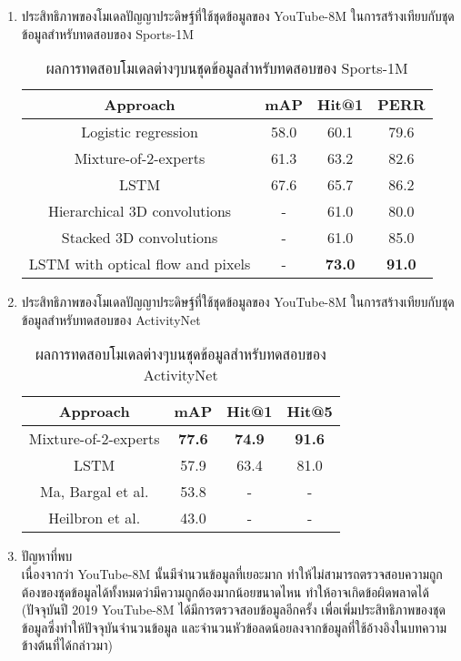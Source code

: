 \begin{enumerate}
\begin{enumerate}
			\clearpage
			\item ประสิทธิภาพของโมเดลปัญญาประดิษฐ์ที่ใช้ชุดข้อมูลของ YouTube-8M ในการสร้างเทียบกับชุดข้อมูลสำหรับทดสอบของ Sports-1M
			\begin{table}[!ht]
				\centering
				\begin{tabular}{|c|c|c|c|}
					\hline
					{Approach} & {mAP} & Hit@1 & PERR\\
					\hline
					Logistic regression & 58.0 & 60.1 & 79.6\\
					Mixture-of-2-experts & 61.3 & 63.2 & 82.6\\
					LSTM & 67.6 & 65.7 & 86.2\\
					\hline
					Hierarchical 3D convolutions\textsuperscript{\cite{karpathy2014large}} & - & 61.0 & 80.0\\
					Stacked 3D convolutions\textsuperscript{\cite{yue2015beyond}} & - & 61.0 & 85.0\\
					LSTM with optical flow and pixels\textsuperscript{\cite{tran2014c3d}} & - & \textbf{73.0} & \textbf{91.0}\\
					\hline
				\end{tabular}
				\caption{ผลการทดสอบโมเดลต่างๆบนชุดข้อมูลสำหรับทดสอบของ Sports-1M}
				\label{tab: youtube_youtube}
			\end{table}
		\item ประสิทธิภาพของโมเดลปัญญาประดิษฐ์ที่ใช้ชุดข้อมูลของ YouTube-8M ในการสร้างเทียบกับชุดข้อมูลสำหรับทดสอบของ ActivityNet
			\begin{table}[!ht]
				\centering
				\begin{tabular}{|c|c|c|c|}
					\hline
					{Approach} & {mAP} & Hit@1 & Hit@5\\
					\hline
					Mixture-of-2-experts & \textbf{77.6} & \textbf{74.9} & \textbf{91.6}\\
					LSTM & 57.9 & 63.4 & 81.0\\
					\hline
					Ma, Bargal et al.\textsuperscript{\cite{ma2017less}} & 53.8 & - & -\\
					Heilbron et al.\textsuperscript{\cite{caba2015activitynet}} & 43.0 & - & -\\
					\hline
				\end{tabular}
				\caption{ผลการทดสอบโมเดลต่างๆบนชุดข้อมูลสำหรับทดสอบของ ActivityNet}
				\label{tab: youtube_youtube}
			\end{table}
		\item ปัญหาที่พบ\\
		เนื่องจากว่า YouTube-8M นั้นมีจำนวนข้อมูลที่เยอะมาก ทำให้ไม่สามารถตรวจสอบความถูกต้องของชุดข้อมูลได้ทั้งหมดว่ามีความถูกต้องมากน้อยขนาดไหน 
		ทำให้อาจเกิดข้อผิดพลาดได้ (ปัจจุบันปี 2019 YouTube-8M ได้มีการตรวจสอบข้อมูลอีกครั้ง เพื่อเพิ่มประสิทธิภาพของชุดข้อมูลซึ่งทำให้ปัจจุบันจำนวนข้อมูล 
		และจำนวนหัวข้อลดน้อยลงจากข้อมูลที่ใช้อ้างอิงในบทความข้างต้นที่ได้กล่าวมา)
	\end{enumerate}	
\end{enumerate}
\clearpage
